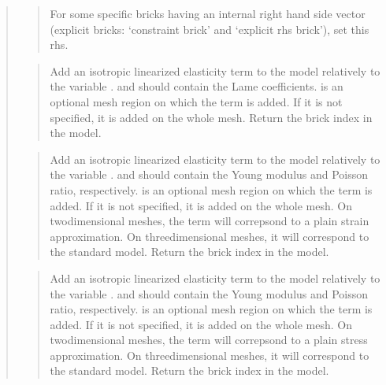 \documentclass[a4paper,11pt,english]{sphinxmanual}
\begin{document}
\begin{quote}
\begin{quote}
\sphinxAtStartPar
For some specific bricks having an internal right hand side vector
(explicit bricks: ‘constraint brick’ and ‘explicit rhs brick’),
set this rhs.
\end{quote}

\sphinxAtStartPar
{}
\begin{quote}

\sphinxAtStartPar
Add an isotropic linearized elasticity term to the model relatively to
the variable .  and  should
contain the Lame coefficients.  is an optional mesh region
on which the term is added. If it is not specified, it is added
on the whole mesh. Return the brick index in the model.
\end{quote}

\sphinxAtStartPar
{}
\begin{quote}

\sphinxAtStartPar
Add an isotropic linearized elasticity term to the model relatively to
the variable .  and  should
contain the Young modulus and Poisson ratio, respectively.
 is an optional mesh region on which the term is added.
If it is not specified, it is added
on the whole mesh.
On two\sphinxhyphen{}dimensional meshes, the term will correpsond to a plain strain
approximation. On three\sphinxhyphen{}dimensional meshes, it will correspond to the
standard model.
Return the brick index in the model.
\end{quote}

\sphinxAtStartPar
{}
\begin{quote}

\sphinxAtStartPar
Add an isotropic linearized elasticity term to the model relatively to
the variable .  and  should
contain the Young modulus and Poisson ratio, respectively.
 is an optional mesh region on which the term is added.
If it is not specified, it is added
on the whole mesh.
On two\sphinxhyphen{}dimensional meshes, the term will correpsond to a plain stress
approximation. On three\sphinxhyphen{}dimensional meshes, it will correspond to the
standard model.
Return the brick index in the model.
\end{quote}


\end{quote}
\end{document}

